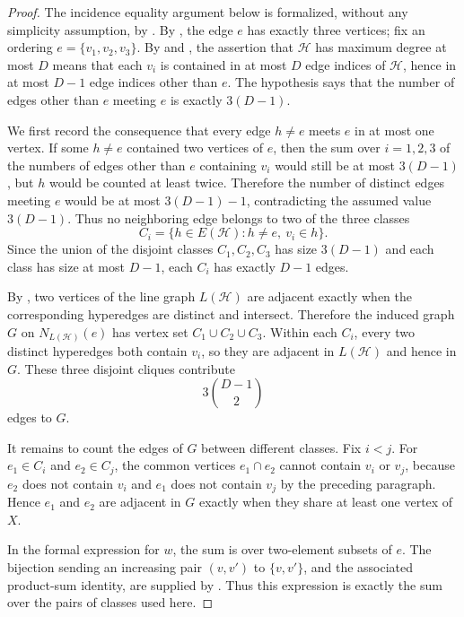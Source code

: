 \begin{proof}
The incidence equality argument below is formalized, without any simplicity
assumption, by .
By , the edge $e$ has exactly three vertices; fix
an ordering $e=\{v_1,v_2,v_3\}$.  By  and
, the assertion that $\mathcal H$ has maximum
degree at most $D$ means that each $v_i$ is contained in at most $D$ edge
indices of $\mathcal H$, hence in at most $D-1$ edge indices other than
$e$.  The hypothesis says that the number of edges other than $e$ meeting
$e$ is exactly $3(D-1)$.

We first record the consequence that every edge $h\ne e$ meets $e$ in at
most one vertex.  If some $h\ne e$ contained two vertices of $e$, then the
sum over $i=1,2,3$ of the numbers of edges other than $e$ containing $v_i$
would still be at most $3(D-1)$, but $h$ would be counted at least twice.
Therefore the number of distinct edges meeting $e$ would be at most
$3(D-1)-1$, contradicting the assumed value $3(D-1)$.  Thus no neighboring
edge belongs to two of the three classes
\[
C_i=\{h\in E(\mathcal H):h\ne e,\ v_i\in h\}.
\]
Since the union of the disjoint classes $C_1,C_2,C_3$ has size $3(D-1)$
and each class has size at most $D-1$, each $C_i$ has exactly $D-1$ edges.

By , two vertices of the line graph
$L(\mathcal H)$ are adjacent exactly when the corresponding hyperedges are
distinct and intersect.  Therefore the induced graph $G$ on
$N_{L(\mathcal H)}(e)$ has vertex set $C_1\cup C_2\cup C_3$.  Within each
$C_i$, every two distinct hyperedges both contain $v_i$, so they are
adjacent in $L(\mathcal H)$ and hence in $G$.  These three disjoint cliques
contribute
\[
3\binom{D-1}{2}
\]
edges to $G$.

It remains to count the edges of $G$ between different classes.  Fix
$i<j$.  For $e_1\in C_i$ and $e_2\in C_j$, the common vertices
$e_1\cap e_2$ cannot contain $v_i$ or $v_j$, because $e_2$ does not contain
$v_i$ and $e_1$ does not contain $v_j$ by the preceding paragraph.  Hence
$e_1$ and $e_2$ are adjacent in $G$ exactly when they share at least one
vertex of $X$.

In the formal expression for $w$, the sum is over two-element subsets of
$e$. The bijection sending an increasing pair $(v,v')$ to $\{v,v'\}$,
and the associated product-sum identity, are supplied by
. Thus this expression is exactly
the sum over the pairs of classes used here.


\end{proof}
